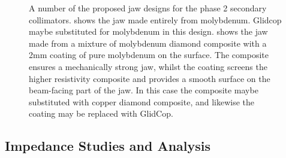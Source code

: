 \begin{figure}
\caption{A number of the proposed jaw designs for the phase 2 secondary collimators.  shows the jaw made entirely from molybdenum. Glidcop maybe substituted for molybdenum in this design.  shows the jaw made from a mixture of molybdenum diamond composite with a 2mm coating of pure molybdenum on the surface. The composite ensures a mechanically strong jaw, whilst the coating screens the higher resistivity composite and provides a smooth surface on the beam-facing part of the jaw. In this case the composite maybe substituted with copper diamond composite, and likewise the coating may be replaced with GlidCop.}
\label{fig:phase-2-jaw-designs}
\end{figure}

\subsection{Impedance Studies and Analysis}

